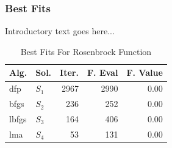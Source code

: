 \documentclass{ieeeaccess}
\begin{document}
\subsubsection{Best Fits}
\label{bestfitsrosenbrock30d30D}


Introductory text goes here...
\begin{table}
\centering
\caption{Best Fits For Rosenbrock Function}
\label{solutions:rosenbrock30d}
\begin{tabular}{llrrr}
\toprule
 Alg. &    Sol. &  Iter. &  F. Eval &  F. Value \\
\midrule
  dfp & $S_{1}$ &   2967 &     2990 &      0.00 \\
 bfgs & $S_{2}$ &    236 &      252 &      0.00 \\
lbfgs & $S_{3}$ &    164 &      406 &      0.00 \\
  lma & $S_{4}$ &     53 &      131 &      0.00 \\
\bottomrule
\end{tabular}
\end{table}
\end{document}
